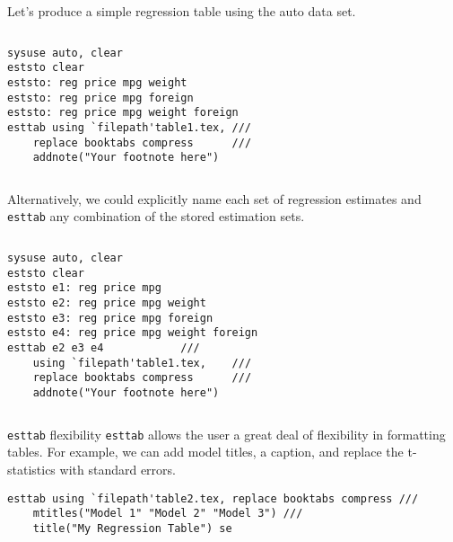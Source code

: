 \documentclass[fleqn, handout, 10pt]{beamer}
\def\results{S:/trainings/exporting_stata_tables_figures/results}
\def\lst{\lstinline}
\begin{document}
\begin{frame}[fragile]{Let's produce a simple regression table using the auto data set.}

    \vspace{1cm}
    \begin{columns}[T]
	    \footnotesize{
	    \begin{lstlisting}
sysuse auto, clear
eststo clear
eststo: reg price mpg weight
eststo: reg price mpg foreign
eststo: reg price mpg weight foreign
esttab using `filepath'table1.tex, ///
    replace booktabs compress	   ///
    addnote("Your footnote here")
	    \end{lstlisting}
	    }
\pause
	    \tiny{
		
	    }
    \end{columns}
\end{frame}

\begin{frame}[fragile]{Alternatively, we could explicitly name each set of regression estimates and \lst=esttab= any combination of the stored estimation sets.}

    \vspace{1cm}
    \begin{columns}[T]
	    \footnotesize{
	    \begin{lstlisting}
sysuse auto, clear
eststo clear
eststo e1: reg price mpg
eststo e2: reg price mpg weight
eststo e3: reg price mpg foreign
eststo e4: reg price mpg weight foreign
esttab e2 e3 e4			   ///
    using `filepath'table1.tex,	   ///
    replace booktabs compress	   ///
    addnote("Your footnote here")
	    \end{lstlisting}
	    }
	    \tiny{
		
	    }
    \end{columns}
\end{frame}

\begin{frame}[fragile]{\lst=esttab= flexibility}
    \lst=esttab= allows the user a great deal of flexibility in formatting tables. For example, we can add model titles, a caption, and replace the t-statistics with standard errors.
    {\footnotesize
    \begin{lstlisting}
esttab using `filepath'table2.tex, replace booktabs compress ///
    mtitles("Model 1" "Model 2" "Model 3") ///
    title("My Regression Table") se
    \end{lstlisting}
    }
    {\tiny
    
    }
\end{frame}
\end{document}
